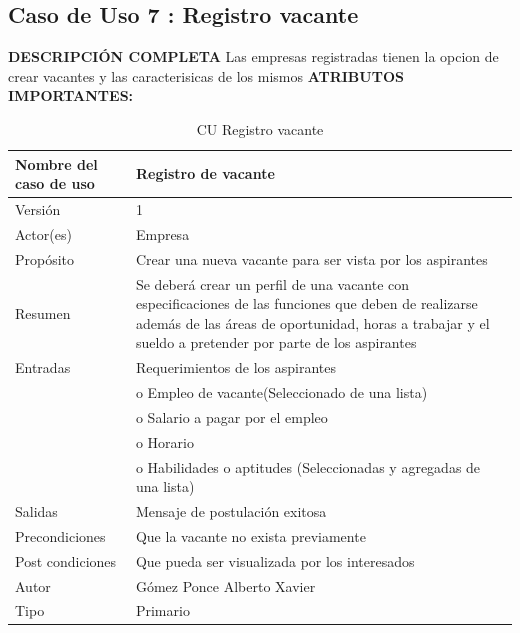 \newpage			
\subsection{Caso de Uso 	7	: Registro vacante	}
		\textbf{DESCRIPCIÓN COMPLETA}	
		\newline 	
		Las empresas registradas tienen la opcion de crear vacantes y las caracterisicas de los mismos	
\newline	\newline	\textbf{ATRIBUTOS IMPORTANTES:}	
\begin{table}[h]			
        \begin{center}			
\begin{tabular}{|l|p{11cm}|} \hline			
Nombre del caso de uso	&	Registro de vacante	\\ \hline
Versión	&	1	\\ \hline
Actor(es)	&	Empresa	\\ \hline
Propósito	&	Crear una nueva vacante para ser vista por los aspirantes	\\ \hline
Resumen	&	Se deberá crear un perfil de una vacante con especificaciones de las funciones que deben de realizarse además de las áreas de oportunidad, horas a trabajar y el sueldo a pretender por parte de los aspirantes	\\ \hline
Entradas	&	Requerimientos de los aspirantes	\\
&		o         Empleo de vacante(Seleccionado de una lista)	\\
&		o         Salario a pagar por el empleo	\\
&		o         Horario	\\
&		o Habilidades o aptitudes (Seleccionadas y agregadas de una lista)	\\ \hline
Salidas	&	Mensaje de postulación exitosa 	\\ \hline
Precondiciones	&	Que la vacante no exista previamente 	\\ \hline
Post condiciones	&	Que pueda ser visualizada por los interesados	\\ \hline
Autor	&	Gómez Ponce Alberto Xavier	\\ \hline
Tipo	&	Primario	\\ \hline
\end{tabular}			
        \caption	{	CU Registro vacante	}
        \label	{tabla	7	}
        \end{center}			
\end{table}			

